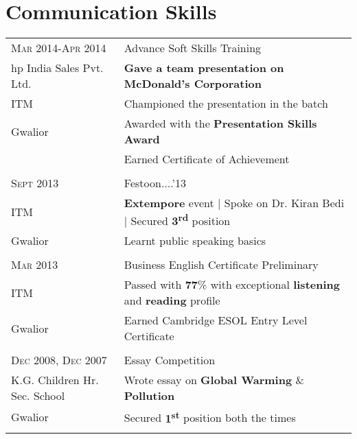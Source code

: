 \documentclass[a4paper,10pt]{article} %
\begin{document}

\section{Communication Skills}

\begin{tabular}{ll}
\textsc{Mar 2014-Apr 2014} & Advance Soft Skills Training\\
hp India Sales Pvt. Ltd. & \textbf{Gave a team presentation on McDonald's Corporation}\\
ITM & Championed the presentation in the batch\\
Gwalior & Awarded with the \textbf{Presentation Skills Award}\\
& Earned Certificate of Achievement\\
&\\

\textsc{Sept} 2013 & Festoon....'13\\
ITM & \textbf{Extempore} event | Spoke on Dr. Kiran Bedi | Secured \textbf{3\textsuperscript{rd}} position\\
Gwalior & Learnt public speaking basics\\
&\\


\textsc{Mar} 2013 & Business English Certificate Preliminary\\
ITM & Passed with \textbf{77}\% with exceptional \textbf{listening} and \textbf{reading} profile\\
Gwalior & Earned Cambridge ESOL Entry Level Certificate\\
&\\


\textsc{Dec} 2008, \textsc{Dec} 2007 & Essay Competition\\
K.G. Children Hr. Sec. School & Wrote essay on \textbf{Global Warming} \& \textbf{Pollution}\\
Gwalior & Secured \textbf{1\textsuperscript{st}} position both the times\\
&\\
\end{tabular}
\end{document}
